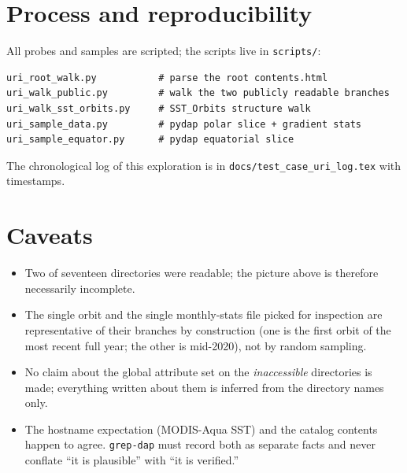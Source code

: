 \documentclass[11pt]{article}
\begin{document}
\section{Process and reproducibility}

All probes and samples are scripted; the scripts live in
\texttt{scripts/}:

\begin{lstlisting}
uri_root_walk.py           # parse the root contents.html
uri_walk_public.py         # walk the two publicly readable branches
uri_walk_sst_orbits.py     # SST_Orbits structure walk
uri_sample_data.py         # pydap polar slice + gradient stats
uri_sample_equator.py      # pydap equatorial slice
\end{lstlisting}

The chronological log of this exploration is in
\texttt{docs/test\_case\_uri\_log.tex} with timestamps.

\section{Caveats}

\begin{itemize}
  \item Two of seventeen directories were readable; the picture
    above is therefore necessarily incomplete.
  \item The single orbit and the single monthly-stats file picked
    for inspection are representative of their branches by
    construction (one is the first orbit of the most recent full
    year; the other is mid-2020), not by random sampling.
  \item No claim about the global attribute set on the
    \emph{inaccessible} directories is made; everything written
    about them is inferred from the directory names only.
  \item The hostname expectation (MODIS-Aqua SST) and the
    catalog contents happen to agree. \texttt{grep-dap} must
    record both as separate facts and never conflate ``it is
    plausible'' with ``it is verified.''
\end{itemize}
\end{document}
